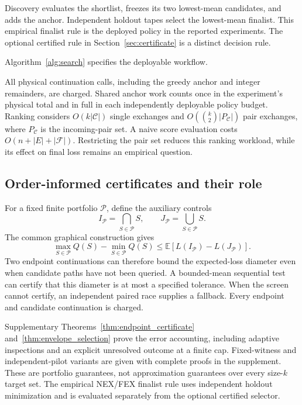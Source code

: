 \documentclass[preprint,11pt,sort&compress]{elsarticle}
\newcommand{\E}{\mathbb E}
\newcommand{\Fset}{\mathcal{F}}
\begin{document}
Discovery evaluates the shortlist, freezes its two lowest-mean candidates, and adds the anchor. Independent holdout tapes select the lowest-mean finalist. This empirical finalist rule is the deployed policy in the reported experiments. The optional certified rule in Section~\ref{sec:certificate} is a distinct decision rule.

Algorithm~\ref{alg:search} specifies the deployable workflow.

All physical continuation calls, including the greedy anchor and integer remainders, are charged. Shared anchor work counts once in the experiment's physical total and in full in each independently deployable policy budget. Ranking considers $O(k|\mathcal C|)$ single exchanges and $O(\binom{k}{2}|P_{\mathcal C}|)$ pair exchanges, where $P_{\mathcal C}$ is the incoming-pair set. A naive score evaluation costs $O(n+|E|+|\Fset|)$. Restricting the pair set reduces this ranking workload, while its effect on final loss remains an empirical question.

\subsection{Order-informed certificates and their role}\label{sec:portfolio_details}
For a fixed finite portfolio $\mathcal P$, define the auxiliary controls
\[
 I_{\mathcal P}=\bigcap_{S\in\mathcal P}S,\qquad
 J_{\mathcal P}=\bigcup_{S\in\mathcal P}S.
\]
The common graphical construction gives
\begin{equation}
\max_{S\in\mathcal P}Q(S)-\min_{S\in\mathcal P}Q(S)
\le \E[L(I_{\mathcal P})-L(J_{\mathcal P})].
\label{eq:portfolio_details}
\end{equation}
Two endpoint continuations can therefore bound the expected-loss diameter even when candidate paths have not been queried. A bounded-mean sequential test can certify that this diameter is at most a specified tolerance. When the screen cannot certify, an independent paired race supplies a fallback. Every endpoint and candidate continuation is charged.

Supplementary Theorems~\ref{thm:endpoint_certificate} and~\ref{thm:envelope_selection} prove the error accounting, including adaptive inspections and an explicit unresolved outcome at a finite cap. Fixed-witness and independent-pilot variants are given with complete proofs in the supplement. These are portfolio guarantees, not approximation guarantees over every size-$k$ target set. The empirical NEX/FEX finalist rule uses independent holdout minimization and is evaluated separately from the optional certified selector.
\end{document}
